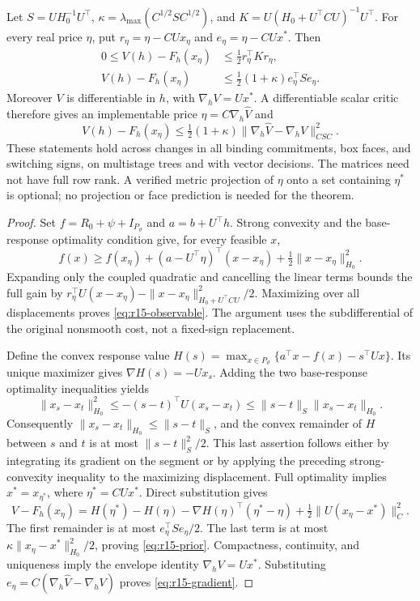 \begin{theorem}\label{thm:r15-global}
Let $S=UH_0^{-1}U^\top$, $\kappa=\lambda_{\max}(C^{1/2}SC^{1/2})$, and
$K=U(H_0+U^\top CU)^{-1}U^\top$. For every real price $\eta$, put
$r_\eta=\eta-CUx_\eta$ and $e_\eta=\eta-CUx^*$. Then
\begin{align}
 0\leq V(h)-F_h(x_\eta)&\leq \tfrac12 r_\eta^\top K r_\eta,\label{eq:r15-observable}\\
 V(h)-F_h(x_\eta)&\leq \tfrac12(1+\kappa)e_\eta^\top S e_\eta.\label{eq:r15-prior}
\end{align}
Moreover $V$ is differentiable in $h$, with $\nabla_hV=Ux^*$. A differentiable scalar critic therefore gives an implementable price $\eta=C\nabla_h\widehat V$ and
\begin{equation}\label{eq:r15-gradient}
 V(h)-F_h(x_\eta)\leq
 \tfrac12(1+\kappa)\|\nabla_h\widehat V-\nabla_hV\|_{CSC}^{2}.
\end{equation}
These statements hold across changes in all binding commitments, box faces, and switching signs, on multistage trees and with vector decisions. The matrices need not have full row rank. A verified metric projection of $\eta$ onto a set containing $\eta^*$ is optional; no projection or face prediction is needed for the theorem.
\end{theorem}
\begin{proof}
Set $f=R_0+\psi+I_{P_\vartheta}$ and $a=b+U^\top h$. Strong convexity and the base-response optimality condition give, for every feasible $x$,
\[
 f(x)\geq f(x_\eta)+(a-U^\top\eta)^\top(x-x_\eta)
                       +\tfrac12\|x-x_\eta\|_{H_0}^2.
\]
Expanding only the coupled quadratic and cancelling the linear terms bounds the full gain by
$r_\eta^\top U(x-x_\eta)-\|x-x_\eta\|_{H_0+U^\top CU}^2/2$.
Maximizing over all displacements proves \eqref{eq:r15-observable}. The argument uses the subdifferential of the original nonsmooth cost, not a fixed-sign replacement.

Define the convex response value
$H(s)=\max_{x\in P_\vartheta}\{a^\top x-f(x)-s^\top Ux\}$.
Its unique maximizer gives $\nabla H(s)=-Ux_s$. Adding the two base-response optimality inequalities yields
\[
 \|x_s-x_t\|_{H_0}^2\leq -(s-t)^\top U(x_s-x_t)
 \leq \|s-t\|_S\|x_s-x_t\|_{H_0}.
\]
Consequently $\|x_s-x_t\|_{H_0}\leq\|s-t\|_S$, and the convex remainder of $H$ between $s$ and $t$ is at most $\|s-t\|_S^2/2$. This last assertion follows either by integrating its gradient on the segment or by applying the preceding strong-convexity inequality to the maximizing displacement. Full optimality implies $x^*=x_{\eta^*}$, where $\eta^*=CUx^*$. Direct substitution gives
\[
 V-F_h(x_\eta)=H(\eta^*)-H(\eta)
 -\nabla H(\eta)^\top(\eta^*-\eta)
 +\tfrac12\|U(x_\eta-x^*)\|_C^2.
\]
The first remainder is at most $e_\eta^\top S e_\eta/2$. The last term is at most
$\kappa\|x_\eta-x^*\|_{H_0}^2/2$, proving \eqref{eq:r15-prior}. Compactness, continuity, and uniqueness imply the envelope identity $\nabla_hV=Ux^*$. Substituting $e_\eta=C(\nabla_h\widehat V-\nabla_hV)$ proves \eqref{eq:r15-gradient}.
\end{proof}

